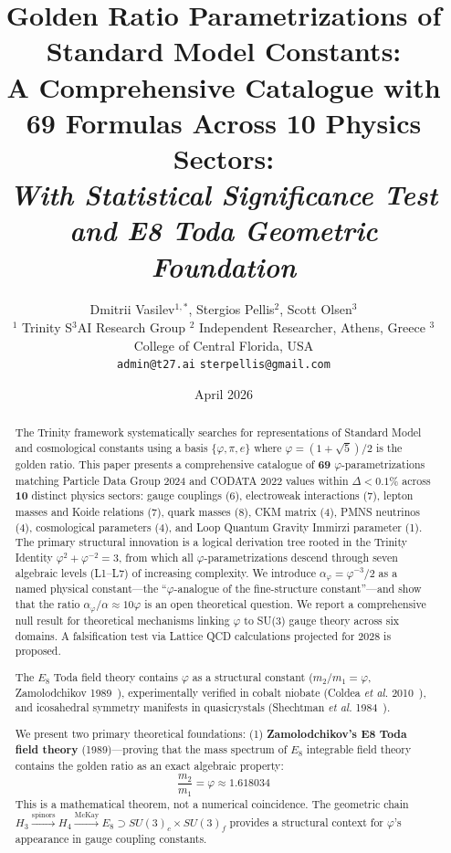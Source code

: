 \documentclass{article}
\title{Golden Ratio Parametrizations of Standard Model Constants:\\[4pt]
A Comprehensive Catalogue with 69 Formulas Across 10 Physics Sectors:\\[4pt]
\textit{With Statistical Significance Test and E8 Toda Geometric Foundation}}
\author{Dmitrii Vasilev$^{1,*}$, Stergios Pellis$^{2}$, Scott Olsen$^{3}$\\[6pt]
{\small $^1$ Trinity S$^3$AI Research Group \quad
        $^2$ Independent Researcher, Athens, Greece \quad
        $^3$ College of Central Florida, USA}\\[6pt]
{\small \texttt{admin@t27.ai} \quad \texttt{sterpellis@gmail.com}}
}
\date{April 2026}
\begin{document}
\maketitle

\begin{abstract}
The Trinity framework systematically searches for representations of Standard Model and cosmological
constants using a basis $\{\varphi, \pi, e\}$ where $\varphi = (1+\sqrt{5})/2$ is the golden ratio.
This paper presents a comprehensive catalogue of \textbf{69} $\varphi$-parametrizations matching
Particle Data Group 2024 and CODATA 2022 values within $\Delta < 0.1\%$ across \textbf{10} distinct
physics sectors: gauge couplings (6), electroweak interactions (7), lepton masses and Koide relations (7),
quark masses (8), CKM matrix (4), PMNS neutrinos (4), cosmological parameters (4), and Loop Quantum
Gravity Immirzi parameter (1). The primary structural innovation is a logical derivation tree rooted in
the Trinity Identity $\varphi^2 + \varphi^{-2} = 3$, from which all $\varphi$-parametrizations descend
through seven algebraic levels (L1--L7) of increasing complexity. We introduce $\alpha_\varphi = \varphi^{-3}/2$
as a named physical constant---the ``$\varphi$-analogue of the fine-structure constant''---and show that
the ratio $\alpha_\varphi/\alpha \approx 10\varphi$ is an open theoretical question. We report a
comprehensive null result for theoretical mechanisms linking $\varphi$ to SU(3) gauge theory across six
domains. A falsification test via Lattice QCD calculations projected for 2028 is proposed.

The $E_8$ Toda field theory contains $\varphi$ as a structural constant
($m_2/m_1 = \varphi$, Zamolodchikov 1989~\cite{zamolodchikov1989}),
experimentally verified in cobalt niobate (Coldea \textit{et al.} 2010~\cite{coldea2010}),
and icosahedral symmetry manifests in quasicrystals (Shechtman \textit{et al.} 1984~\cite{shechtman1984}).

We present two primary theoretical foundations:
(1) \textbf{Zamolodchikov's E8 Toda field theory} (1989)---proving that the mass spectrum of
$E_8$ integrable field theory contains the golden ratio as an exact algebraic property:
\begin{equation}
  \frac{m_2}{m_1} = \varphi \approx 1.618034
  \label{eq:zamolodchikov}
\end{equation}
This is a mathematical theorem, not a numerical coincidence. The geometric chain
$H_3 \xrightarrow{\text{spinors}} H_4 \xrightarrow{\text{McKay}} E_8 \supset SU(3)_c \times SU(3)_f$
provides a structural context for $\varphi$'s appearance in gauge coupling constants.


\end{abstract}
\end{document}
